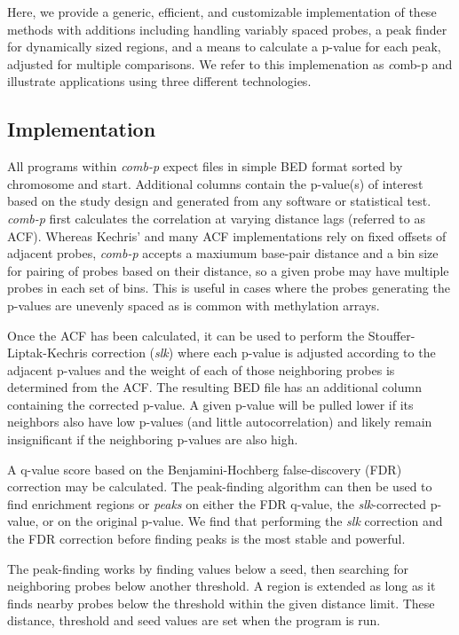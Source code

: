 \documentclass{bioinfo}
\begin{document}
Here, we provide a generic, efficient, and customizable implementation
of these methods with additions including handling variably spaced
probes, a peak finder for dynamically sized regions, and a means to
calculate a p-value for each peak, adjusted for multiple
comparisons. We refer to this implemenation as {\textit comb-p} and
illustrate applications using three different technologies.

\begin{methods}

\section{Implementation}

All programs within \textit{comb-p} expect files in simple BED format
\citep{Kent2002} sorted by chromosome and start.
Additional columns contain the p-value(s) of interest based on the
study design and generated from any software or statistical test.
\textit{comb-p} first
calculates the correlation at varying distance lags (referred to as ACF).
 Whereas Kechris'
\citep{Kechris2010} and many ACF implementations rely on fixed offsets
of adjacent probes, \textit{comb-p} accepts a maxiumum base-pair
distance and a bin size for pairing of probes based on their distance,
so a given probe may have multiple probes in each set of
bins. This is useful in cases where the probes generating the p-values
are unevenly spaced as is common with methylation arrays.

Once the ACF has been calculated, it can be used to perform the
Stouffer-Liptak-Kechris correction (\textit{slk}) where each p-value is
adjusted according to the adjacent p-values and the weight of each of
those neighboring probes is determined from the ACF. The resulting BED file
has an additional column containing the corrected p-value.
A given p-value will be pulled lower if its neighbors also have low
p-values (and little autocorrelation) and likely remain insignificant if the
neighboring p-values are also high.

A q-value score based on the Benjamini-Hochberg false-discovery (FDR)
correction may be calculated. The peak-finding algorithm can then be
used to find enrichment regions or \textit{peaks} on either the FDR
q-value, the \textit{slk}-corrected p-value, or on the original
p-value.  We find that performing the \textit{slk} correction and the
FDR correction before finding peaks is the most stable and
powerful.

The peak-finding works by finding values below a seed, then searching
for neighboring probes below another threshold. A region is extended
as long as it finds nearby probes below the threshold within the given
distance limit. These distance, threshold and seed values are set when
the program is run.


\end{methods}
\end{document}
